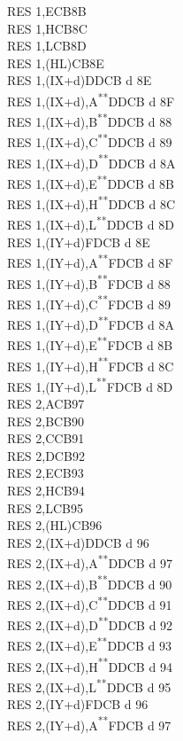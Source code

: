 \documentclass[12pt,twoside,openright,a4paper]{book}
\newcommand{\UNDOC}{\textnormal{\textsuperscript{**}}}
\begin{document}
\begin{multicols}{3}
{\begin{tabbing}
		RES 1,E\>CB8B\\
		RES 1,H\>CB8C\\
		RES 1,L\>CB8D\\
		RES 1,(HL)\>CB8E\\
		RES 1,(IX+d)\>DDCB d 8E\\
		RES 1,(IX+d),A\UNDOC\>DDCB d 8F\\
		RES 1,(IX+d),B\UNDOC\>DDCB d 88\\
		RES 1,(IX+d),C\UNDOC\>DDCB d 89\\
		RES 1,(IX+d),D\UNDOC\>DDCB d 8A\\
		RES 1,(IX+d),E\UNDOC\>DDCB d 8B\\
		RES 1,(IX+d),H\UNDOC\>DDCB d 8C\\
		RES 1,(IX+d),L\UNDOC\>DDCB d 8D\\
		RES 1,(IY+d)\>FDCB d 8E\\
		RES 1,(IY+d),A\UNDOC\>FDCB d 8F\\
		RES 1,(IY+d),B\UNDOC\>FDCB d 88\\
		RES 1,(IY+d),C\UNDOC\>FDCB d 89\\
		RES 1,(IY+d),D\UNDOC\>FDCB d 8A\\
		RES 1,(IY+d),E\UNDOC\>FDCB d 8B\\
		RES 1,(IY+d),H\UNDOC\>FDCB d 8C\\
		RES 1,(IY+d),L\UNDOC\>FDCB d 8D\\
		RES 2,A\>CB97\\
		RES 2,B\>CB90\\
		RES 2,C\>CB91\\
		RES 2,D\>CB92\\
		RES 2,E\>CB93\\
		RES 2,H\>CB94\\
		RES 2,L\>CB95\\
		RES 2,(HL)\>CB96\\
		RES 2,(IX+d)\>DDCB d 96\\
		RES 2,(IX+d),A\UNDOC\>DDCB d 97\\
		RES 2,(IX+d),B\UNDOC\>DDCB d 90\\
		RES 2,(IX+d),C\UNDOC\>DDCB d 91\\
		RES 2,(IX+d),D\UNDOC\>DDCB d 92\\
		RES 2,(IX+d),E\UNDOC\>DDCB d 93\\
		RES 2,(IX+d),H\UNDOC\>DDCB d 94\\
		RES 2,(IX+d),L\UNDOC\>DDCB d 95\\
		RES 2,(IY+d)\>FDCB d 96\\
		RES 2,(IY+d),A\UNDOC\>FDCB d 97\\

\end{tabbing}}
\end{multicols}
\end{document}

